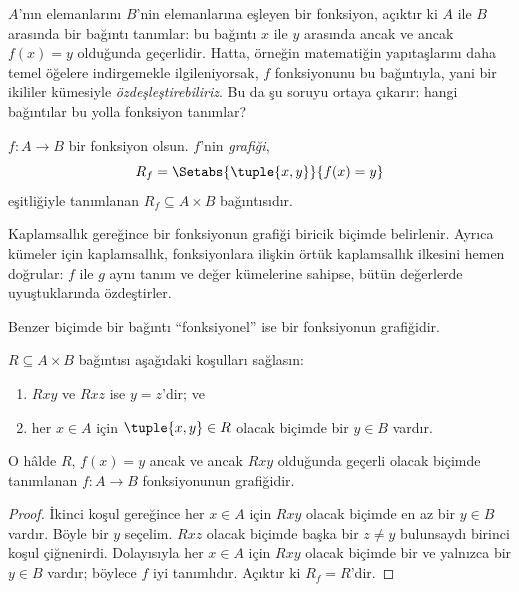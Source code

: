 \documentclass[../../../include/open-logic-section]{subfiles}
\begin{document}


\begin{explain}
$A$'nın elemanlarını $B$'nin elemanlarına eşleyen bir fonksiyon, açıktır ki
$A$ ile $B$ arasında bir bağıntı tanımlar: bu bağıntı $x$ ile $y$ arasında
ancak ve ancak $f(x)=y$ olduğunda geçerlidir. Hatta, örneğin matematiğin
yapıtaşlarını daha temel öğelere indirgemekle ilgileniyorsak, $f$
fonksiyonunu bu bağıntıyla, yani bir ikililer kümesiyle
\emph{özdeşleştirebiliriz}. Bu da şu soruyu ortaya çıkarır: hangi bağıntılar
bu yolla fonksiyon tanımlar?
\end{explain}

\begin{defn} $f\colon A \to B$ bir fonksiyon olsun.
$f$'nin \emph{grafiği},
\[
R_f = \Setabs{\tuple{x,y}}{f(x) = y}
\]
eşitliğiyle tanımlanan $R_f \subseteq A \times B$ bağıntısıdır.
\end{defn}

\begin{explain}
Kaplamsallık gereğince bir fonksiyonun grafiği biricik biçimde belirlenir.
Ayrıca kümeler için kaplamsallık, fonksiyonlara ilişkin örtük kaplamsallık
ilkesini hemen doğrular: $f$ ile $g$ aynı tanım ve değer kümelerine sahipse,
bütün değerlerde uyuştuklarında özdeştirler.

Benzer biçimde bir bağıntı ``fonksiyonel'' ise bir fonksiyonun grafiğidir.
\end{explain}

\begin{prop}
$R \subseteq A \times B$ bağıntısı aşağıdaki koşulları sağlasın:
\begin{enumerate}
\item $Rxy$ ve $Rxz$ ise $y=z$'dir; ve
\item her $x \in A$ için $\tuple{x,y}\in R$ olacak biçimde bir $y \in B$
vardır.
\end{enumerate}
O hâlde $R$, $f(x)=y$ ancak ve ancak $Rxy$ olduğunda geçerli olacak biçimde
tanımlanan $f\colon A \to B$ fonksiyonunun grafiğidir.
\end{prop}

\begin{proof}
İkinci koşul gereğince her $x \in A$ için $Rxy$ olacak biçimde en az bir
$y \in B$ vardır. Böyle bir $y$ seçelim. $Rxz$ olacak biçimde başka bir
$z\neq y$ bulunsaydı birinci koşul çiğnenirdi. Dolayısıyla her $x \in A$ için
$Rxy$ olacak biçimde bir ve yalnızca bir $y \in B$ vardır; böylece $f$ iyi
tanımlıdır. Açıktır ki $R_f=R$'dir.
\end{proof}
\end{document}
